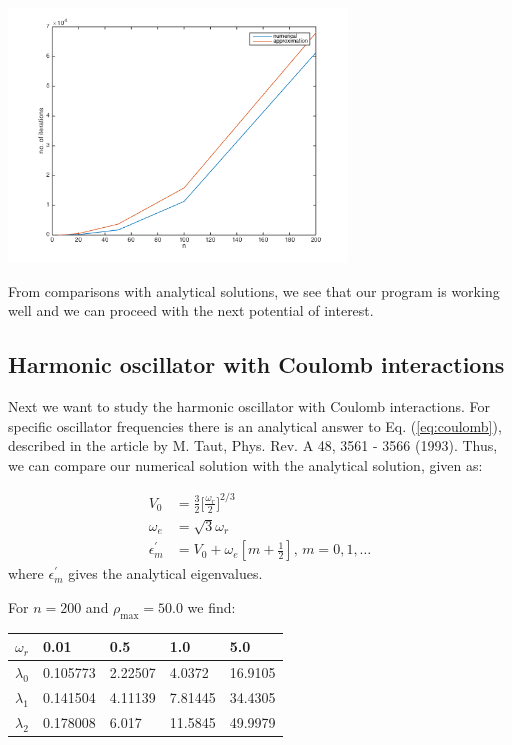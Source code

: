 \documentclass{article}
\begin{document}
\begin{multicols}{2}
\begin{center}
	\includegraphics[width=90mm]{../build-Project2-Desktop_Qt_5_5_0_clang_64bit-Debug/iterations.png} 	
	\label{fig:iterations}
\end{center}
From comparisons with analytical solutions, we see that our program is working well and we can proceed with the next potential of interest.



\subsection{Harmonic oscillator with Coulomb interactions}
Next we want to study the harmonic oscillator with Coulomb interactions. For specific oscillator frequencies there is an analytical answer to Eq. (\ref{eq:coulomb}), described in the article by M. Taut, Phys. Rev. A 48, 3561 - 3566 (1993). Thus, we can compare our numerical solution with the analytical solution, given as:

\begin{equation}
\begin{aligned}
	V_0 &= \frac{3}{2} \bigg[ \frac{\omega_r}{2} \bigg]^{2/3} \\
	\omega_e &= \sqrt{3} \omega_r \\
	\epsilon_m^{'} &= V_0 + \omega_e [m + \frac{1}{2}] \textrm{,       } m = 0,1, \dots
\end{aligned}
\end{equation}
where $\epsilon_m^{'}$ gives the analytical eigenvalues.

For $n = 200$ and $\rho_{\textrm{max}} = 50.0$ we find:

\begin{center}
\begin{tabular}{ l l l l l }\hline
	$\omega_r$ 	& 0.01		& 0.5		& 1.0	&5.0\\ \hline
	$\lambda_0$ 	& 0.105773	& 2.22507		& 4.0372	& 16.9105\\
	$\lambda_1$ 	& 0.141504	& 4.11139		& 7.81445	& 34.4305 \\
	$\lambda_2$ 	& 0.178008	& 6.017		& 11.5845	& 49.9979\\
	\hline
\end{tabular}
\end{center}


\end{multicols}
\end{document}
